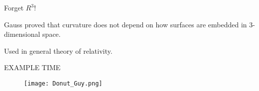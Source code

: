 \documentclass{beamer}
\begin{document}
\begin{frame}
\begin{center}
Forget $R^{3}$! 

Gauss proved that curvature does not depend on how surfaces are embedded in 3-dimensional space.

Used in general theory of relativity. 
\end{center}
\end{frame}

\begin{frame}[t]
\begin{center}
\Huge EXAMPLE TIME
\end{center}
\begin{figure}[ht!]
\centering
\texttt{[image: Donut\_Guy.png]}
\caption{}
\label{overflow}
\end{figure}

\end{frame}
\end{document}
